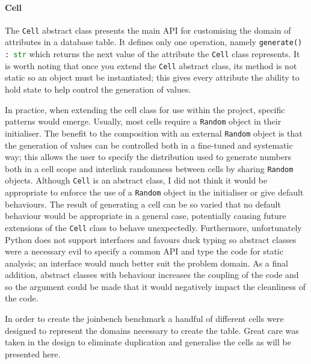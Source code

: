 \paragraph{Cell} The \lstinline{Cell} abstract class presents the main API for
customising the domain of attributes in a database table. It defines only one
operation, namely \lstinline[language=Python]{generate() : str} which returns the next value of
the attribute the \lstinline{Cell} class represents. It is worth noting that
once you extend the \lstinline{Cell} abstract class, its method is not static so
an object must be instantiated; this gives every attribute the ability to hold
state to help control the generation of values.

In practice, when extending the cell class for use within the project, specific
patterns would emerge. Usually, most cells require a
\lstinline{Random} object in their initialiser. The benefit to the composition
with an external \lstinline{Random} object is that the generation of values can
be controlled both in a fine-tuned and systematic way; this allows the user to
specify the distribution used to generate numbers both in a cell scope and
interlink randomness between cells by sharing \lstinline{Random} objects.
Although \lstinline{Cell} is an abstract class, I did not think it would be
appropriate to enforce the use of a \lstinline{Random} object in the initialiser
or give default behaviours. The result of generating a cell can be so varied
that no default behaviour would be appropriate in a general case, potentially
causing future extensions of the \lstinline{Cell} class to behave unexpectedly.
Furthermore, unfortunately Python does not support interfaces and favours duck
typing so abstract classes were a necessary evil to specify a common API and
type the code for static analysis; an interface would much better suit
the problem domain. As a final addition, abstract classes with behaviour
increases the coupling of the code and so the argument could be made that it would
negatively impact the cleanliness of the code.

In order to create the joinbench benchmark a handful of different cells were
designed to represent the domains necessary to create the 
table. Great care was taken in the design to eliminate duplication and
generalise the cells as will be presented here.

